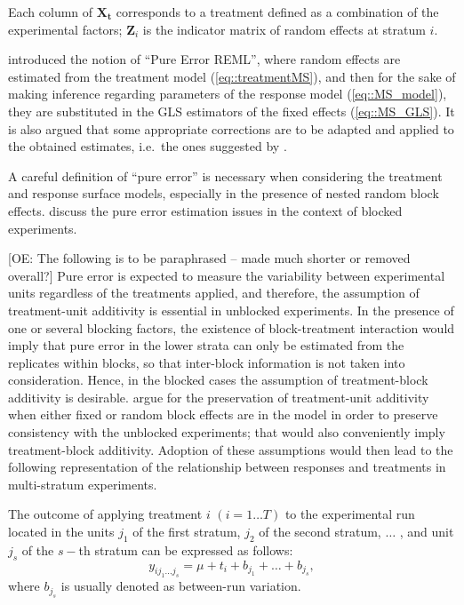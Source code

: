 Each column of $\bm{X_t}$ corresponds to a treatment defined as a combination of the experimental factors;
$\bm{Z}_{i}$ is the indicator matrix of random effects at stratum $i$.

\cite{GilmourGoos2016PEREML} introduced the notion of ``Pure Error REML'', where random effects are estimated from the treatment model (\ref{eq::treatmentMS}), and then for the sake of making inference regarding parameters of the response model (\ref{eq::MS_model}), they are substituted in the GLS estimators of the fixed effects (\ref{eq::MS_GLS}). It is also argued that some appropriate corrections are to be adapted and applied to the obtained estimates, i.e.~the ones suggested by \cite{kenward1997small}. 

A careful definition of ``pure error'' is necessary when considering the treatment and response surface models, especially in the presence of nested random block effects. \cite{Gilmour2000PErsm} discuss the pure error estimation issues in the context of blocked experiments. 

[OE: The following is to be paraphrased -- made much shorter or removed overall?]
Pure error is expected to measure the variability between experimental units regardless of the treatments applied, and therefore, the assumption of treatment-unit additivity is essential in unblocked experiments.  In the presence of one or several blocking factors, the existence of block-treatment interaction would imply that pure error in the lower strata can only be estimated from the replicates within blocks, so that inter-block information is not taken into consideration. Hence, in the blocked cases the assumption of treatment-block additivity \citep{Draper1998} is desirable. \cite{Gilmour2000PErsm} argue for the preservation of treatment-unit additivity when either fixed or random block effects are in the model in order to preserve consistency with the unblocked experiments; that would also conveniently imply treatment-block additivity. Adoption of these assumptions would then lead to the following representation of the relationship between responses and treatments in multi-stratum experiments. 

The outcome of applying treatment $i$ $(i=1\ldots T)$ to the experimental run located in the units $j_1$ of the first stratum, $j_2$ of the second stratum, $\ldots$ , and unit $j_s$ of the $s-$th stratum can be expressed as follows:
\begin{equation}
\label{eq::ms_tr}
y_{ij_{1}...j_{s}}=\mu+t_{i}+b_{j_1}+\ldots +b_{j_s},
\end{equation}
where $b_{j_s}$ is usually denoted as between-run variation. 

